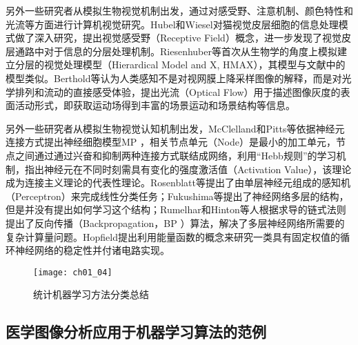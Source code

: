 另外一些研究者从模拟生物视觉机制出发，通过对感受野、注意机制、颜色特性和光流等方面进行计算机视觉研究。Hubel和Wiesel\citep{Hubel1962Receptive}对猫视觉皮层细胞的信息处理模式做了深入研究，提出视觉感受野（Receptive Field）概念，进一步发现了视觉皮层通路中对于信息的分层处理机制。Riesenhuber等\citep{Riesenhuber1999}首次从生物学的角度上模拟建立分层的视觉处理模型（Hierardical Model and X, HMAX），其模型与文献中的模型类似。Berthold等\citep{Horn1981}认为人类感知不是对视网膜上降采样图像的解释，而是对光学排列和流动的直接感受体验，提出光流（Optical Flow）用于描述图像灰度的表面活动形式，即获取运动场得到丰富的场景运动和场景结构等信息。

另外一些研究者从模拟生物视觉认知机制出发，McClelland和Pitts等依据神经元连接方式提出神经细胞模型MP ，相关节点单元（Node）是最小的加工单元，节点之间通过通过兴奋和抑制两种连接方式联结成网络，利用“Hebb规则”的学习机制，指出神经元在不同时刻需具有变化的强度激活值（Activation Value），该理论成为连接主义理论的代表性理论。Rosenblatt等\citep{Rosenblatt1958}提出了由单层神经元组成的感知机（Perceptron）来完成线性分类任务；Fukushima等\citep{Fukushima1982Neocognitron}提出了神经网络多层的结构，但是并没有提出如何学习这个结构；Rumelhar和Hinton等人\citep{Rumelhart1988Learning}根据求导的链式法则提出了反向传播（Backpropagation，BP ）算法，解决了多层神经网络所需要的复杂计算量问题。Hopfield提出利用能量函数的概念来研究一类具有固定权值的循环神经网络的稳定性并付诸电路实现。

\begin{figure}[!htbp]
    \centering
    \texttt{[image: ch01\_04]}
    \caption{统计机器学习方法分类总结}
    \label{fig:ch01_04}
\end{figure}
\subsection{医学图像分析应用于机器学习算法的范例}

